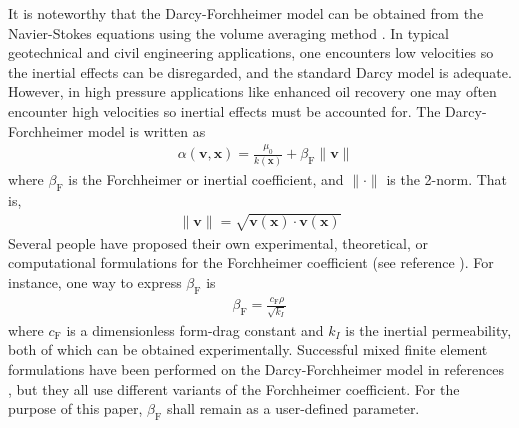 \documentclass[11pt,reqno]{amsart}
\begin{document}
It is noteworthy that the Darcy-Forchheimer model can 
be obtained from the Navier-Stokes equations using the 
volume averaging method \cite{ISI:A1996VK96700002}. In 
typical geotechnical and civil engineering applications, 
one encounters low velocities so the inertial effects 
can be disregarded, and the standard Darcy model is 
adequate. However, in high pressure applications like 
enhanced oil recovery one may often encounter high 
velocities so inertial effects must be accounted for. 
The Darcy-Forchheimer model is written as 
\begin{align}
  \label{Eqn:GE_Forchheimer}
  &\alpha(\mathbf{v},\mathbf{x}) = 
  \frac{\mu_0}{k(\mathbf{x})}    
  + \beta_{\mathrm{F}} \|\mathbf{v}\| 
\end{align}
where $\beta_{\mathrm{F}}$ is the Forchheimer 
or inertial coefficient, and $\|\cdot\|$ 
is the 2-norm. That is, 
\begin{align}
  \|\mathbf{v}\| = \sqrt{\mathbf{v}(\mathbf{x}) 
    \cdot \mathbf{v}(\mathbf{x})}
\end{align}
Several people have proposed their own experimental, 
theoretical, or computational formulations for the 
Forchheimer coefficient (see reference \cite{W_sobieski}). 
For instance, one way to express $\beta_{\mathrm{F}}$ is
\begin{align}
  \label{Eqn:GE_inertial}
  \beta_{\mathrm{F}} = \frac{c_{\mathrm{F}}\rho}{\sqrt{k_{I}}}
\end{align}
where $c_{\mathrm{F}}$ is a dimensionless form-drag constant 
and $k_{I}$ is the inertial permeability, both of which can 
be obtained experimentally. Successful mixed finite element 
formulations have been performed on the Darcy-Forchheimer 
model in references \cite{EJ_Park,Hao_Pan_Forchheimer}, 
but they all use different variants of the Forchheimer 
coefficient. For the purpose of this paper, $\beta_{\mathrm{F}}$ 
shall remain as a user-defined parameter.
\end{document}
